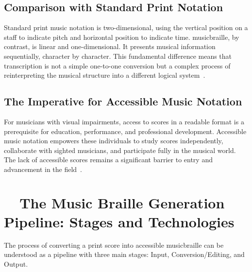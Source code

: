 \subsection{Comparison with Standard Print Notation}\label{ch10:ssec:comparison-with-print}
Standard print music notation is two-dimensional, using the vertical position on a staff to indicate pitch and horizontal position to indicate time. \gls{musicbraille}, by contrast, is linear and one-dimensional. It presents musical information sequentially, character by character. This fundamental difference means that transcription is not a simple one-to-one conversion but a complex process of reinterpreting the musical structure into a different logical system~\supercite{rnib-braille-music}.

\subsection{The Imperative for Accessible Music Notation}\label{ch10:ssec:imperative-for-accessibility}
For musicians with visual impairments, access to scores in a readable format is a prerequisite for education, performance, and professional development. Accessible music notation empowers these individuals to study scores independently, collaborate with sighted musicians, and participate fully in the musical world. The lack of accessible scores remains a significant barrier to entry and advancement in the field~\supercite{MusicAccessibilityResources}.

\section{~~The Music Braille Generation Pipeline: Stages and Technologies}\label{ch10:sec:pipeline}
The process of converting a print score into accessible \gls{musicbraille} can be understood as a pipeline with three main stages: Input, Conversion/Editing, and Output.

